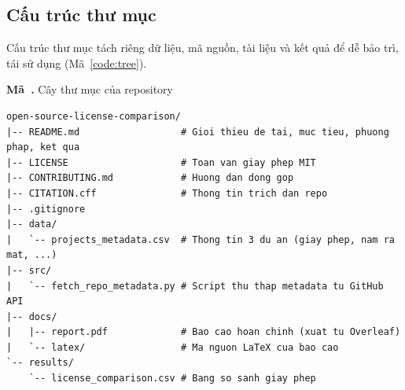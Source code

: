 \documentclass[12pt,a4paper]{article}
\newcounter{code}
\newcommand{\codecap}[2]{\refstepcounter{code}\label{#2}\par\vspace{4pt}\noindent\textbf{Mã~\thecode.} #1\par\nopagebreak\vspace{2pt}}
\begin{document}
\subsection{Cấu trúc thư mục}\label{sec:tree}
Cấu trúc thư mục tách riêng dữ liệu, mã nguồn, tài liệu và kết quả để dễ bảo trì, tái sử dụng (Mã~\ref{code:tree}).

\codecap{Cây thư mục của repository}{code:tree}
\begin{Verbatim}
open-source-license-comparison/
|-- README.md                  # Gioi thieu de tai, muc tieu, phuong phap, ket qua
|-- LICENSE                    # Toan van giay phep MIT
|-- CONTRIBUTING.md            # Huong dan dong gop
|-- CITATION.cff               # Thong tin trich dan repo
|-- .gitignore
|-- data/
|   `-- projects_metadata.csv  # Thong tin 3 du an (giay phep, nam ra mat, ...)
|-- src/
|   `-- fetch_repo_metadata.py # Script thu thap metadata tu GitHub API
|-- docs/
|   |-- report.pdf             # Bao cao hoan chinh (xuat tu Overleaf)
|   `-- latex/                 # Ma nguon LaTeX cua bao cao
`-- results/
    `-- license_comparison.csv # Bang so sanh giay phep
\end{Verbatim}
\end{document}
